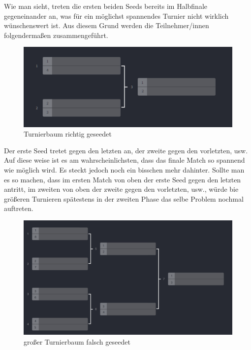 Wie man sieht, treten die ersten beiden Seeds bereits im Halbfinale gegeneinander an, was für ein möglichst spannendes Turnier nicht wirklich wünschenswert ist. Aus diesem Grund werden die Teilnehmer/innen folgendermaßen zusammengeführt.

\begin{figure}[H]
    \includegraphics[scale=0.515]{pics/backend/elimination/elimination_tree_seeded.png}
    \caption{Turnierbaum richtig geseedet\cite{implementation-execution-1}}
\end{figure}

Der erste Seed tretet gegen den letzten an, der zweite gegen den vorletzten, usw. Auf diese weise ist es am wahrscheinlichsten, dass das finale Match so spannend wie möglich wird. 
Es steckt jedoch noch ein bisschen mehr dahinter. Sollte man es so machen, dass im ersten Match von oben der erste Seed gegen den letzten antritt, im zweiten von oben der zweite gegen den vorletzten, usw., 
würde bie größeren Turnieren spätestens in der zweiten Phase das selbe Problem nochmal auftreten.

\begin{figure}[H]
    \includegraphics[scale=0.25]{pics/backend/elimination/elimination_tree_seeded_wrong_big.png}
    \caption{großer Turnierbaum falsch geseedet\cite{implementation-execution-1}}
\end{figure}

